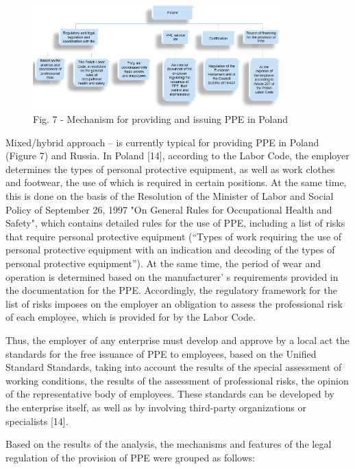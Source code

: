 \begin{figure}[H]
	\centering
	\includegraphics[width=0.85\textwidth]{media/chem2/image7}
	\caption*{Fig. 7 - Mechanism for providing and issuing PPE in Poland}
\end{figure}

\begin{multicols}{2}
Mixed/hybrid approach -- is currently typical for providing PPE in
Poland (Figure 7) and Russia. In Poland {[}14{]}, according to the Labor
Code, the employer determines the types of personal protective
equipment, as well as work clothes and footwear, the use of which is
required in certain positions. At the same time, this is done on the
basis of the Resolution of the Minister of Labor and Social Policy of
September 26, 1997 "On General Rules for Occupational Health and
Safety", which contains detailed rules for the use of PPE, including a
list of risks that require personal protective equipment (``Types of
work requiring the use of personal protective equipment with an
indication and decoding of the types of personal protective
equipment''). At the same time, the period of wear and operation is
determined based on the manufacturer' s requirements
provided in the documentation for the PPE. Accordingly, the regulatory
framework for the list of risks imposes on the employer an obligation to
assess the professional risk of each employee, which is provided for by
the Labor Code.

Thus, the employer of any enterprise must develop and approve by a local
act the standards for the free issuance of PPE to employees, based on
the Unified Standard Standards, taking into account the results of the
special assessment of working conditions, the results of the assessment
of professional risks, the opinion of the representative body of
employees. These standards can be developed by the enterprise itself, as
well as by involving third-party organizations or specialists {[}14{]}.

Based on the results of the analysis, the mechanisms and features of the
legal regulation of the provision of PPE were grouped as follows:


\end{multicols}
